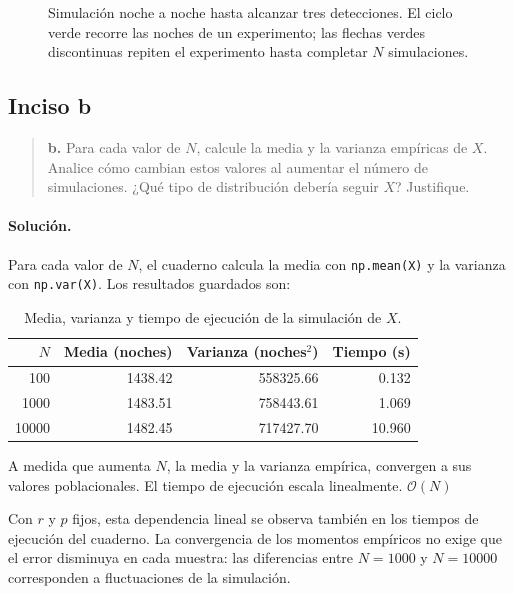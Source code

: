 \documentclass[11pt,a4paper]{article}
\begin{document}
\begin{figure}[H]
    \centering
    
    \caption{Simulación noche a noche hasta alcanzar tres detecciones. El ciclo verde recorre las noches de un experimento; las flechas verdes discontinuas repiten el experimento hasta completar $N$ simulaciones.}
    \label{fig:flujo-tres-detecciones}
\end{figure}

\subsection*{Inciso b}

\begin{quote}
\textbf{b.} Para cada valor de $N$, calcule la media y la varianza empíricas de $X$. Analice cómo cambian estos valores al aumentar el número de simulaciones. ¿Qué tipo de distribución debería seguir $X$? Justifique.
\end{quote}

\paragraph{Solución.}

Para cada valor de $N$, el cuaderno calcula la media con \texttt{np.mean(X)} y la varianza con \texttt{np.var(X)}. Los resultados guardados son:

\begin{table}[H]
    \centering
    \caption{Media, varianza y tiempo de ejecución de la simulación de $X$.}
    \label{tab:simulacion-x}
    \begin{tabular}{rrrr}
        \toprule
        $N$ & Media (noches) & Varianza (noches$^2$) & Tiempo (s)\\
        \midrule
        100   & 1438.42 & 558325.66 & 0.132\\
        1000  & 1483.51 & 758443.61 & 1.069\\
        10000 & 1482.45 & 717427.70 & 10.960\\
        \bottomrule
    \end{tabular}
\end{table}

A medida que aumenta $N$, la media y la varianza empírica, convergen a sus valores poblacionales.
El tiempo de ejecución escala linealmente. $\mathcal{O}(N)$

Con $r$ y $p$ fijos, esta dependencia lineal se observa también en los tiempos de ejecución del cuaderno. La convergencia de los momentos empíricos no exige que el error disminuya en cada muestra: las diferencias entre $N=1000$ y $N=10000$ corresponden a fluctuaciones de la simulación.
\end{document}

